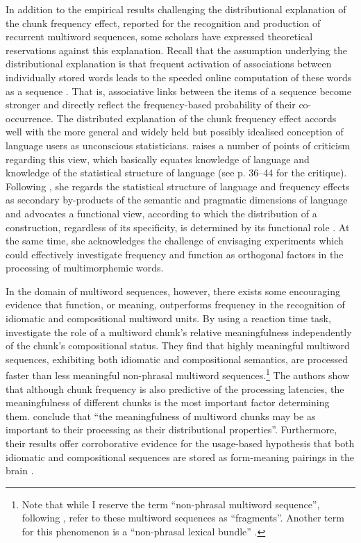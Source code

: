 In addition to the empirical results challenging the distributional explanation of the chunk frequency effect, reported for the recognition and production of recurrent multiword sequences, some scholars have expressed theoretical reservations against this explanation. Recall that the assumption underlying the distributional explanation is that frequent activation of associations between individually stored words leads to the speeded online computation of these words as a sequence \citep[cf.][]{jurafsky-etal2001,mcdonald-shillcock}. That is, associative links between the items of a sequence become stronger and directly reflect the frequency-based probability of their co-occurrence. The distributed explanation of the chunk frequency effect accords well with the more general and widely held but possibly idealised conception of   language users as unconscious statisticians. \citet[][41]{blumenthal} raises a number of points of criticism regarding this view, which basically equates knowledge of language and knowledge of the statistical structure of language (see p. 36--44 for the critique). Following \citet{bley-vroman}, she regards the statistical structure of language and frequency effects as secondary by-products of the semantic and pragmatic dimensions of language and advocates a functional view, according to which the distribution of a construction, regardless of its specificity, is determined by its functional role \citep[cf.][]{goldberg-2006}. At the same time, she acknowledges the challenge of envisaging experiments which could effectively investigate frequency and function as orthogonal factors in the processing of multimorphemic words. 

In the domain of multiword sequences, however, there exists some encouraging evidence that function, or meaning, outperforms frequency in the recognition of idiomatic and compositional multiword units. By using a reaction time task, \citet{jolsvai-etal} investigate the role of a multiword chunk's relative meaningfulness independently of the chunk's compositional status. They find that highly meaningful multiword sequences, exhibiting both idiomatic and compositional semantics, are processed faster than less meaningful non-phrasal multiword sequences.\footnote{Note that while I reserve the term ``non-phrasal multiword sequence'', following \citet[]{tremblay-baayen}, \citeauthor{jolsvai-etal} refer to these multiword sequences as ``fragments''. Another term for this phenomenon is a ``non-phrasal lexical bundle'' \citep{biber-etal-1999,tremblay-etal11}.} The authors show that although chunk frequency is also predictive of the processing latencies, the meaningfulness of different chunks is the most important factor determining them. \citet[][696]{jolsvai-etal} conclude that ``the meaningfulness of multiword chunks may be as important to their processing as their distributional properties''. Furthermore,  their results offer corroborative evidence for the usage-based hypothesis that both idiomatic and compositional sequences are stored as form-meaning pairings in the brain \citep{bybee-book-2010,goldberg-2003,goldberg-2006}. 

